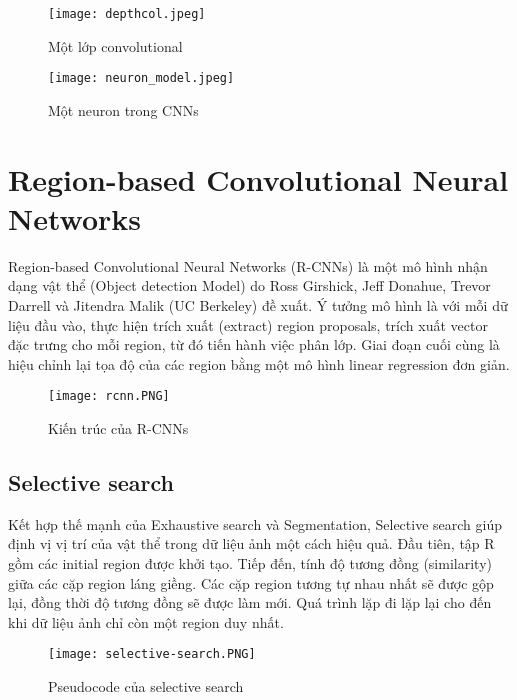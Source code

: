 \documentclass[../thesis.tex]{subfiles}
\begin{document}
\begin{figure}[!htb]
	\begin{minipage}{0.48\textwidth}
		\centering
		\texttt{[image: depthcol.jpeg]}
		\caption{Một lớp convolutional}\label{Fig:depthcol}
	\end{minipage}\hfill
	\begin {minipage}{0.48\textwidth}
		\centering
		\texttt{[image: neuron\_model.jpeg]}
		\caption{Một neuron trong CNNs}\label{Fig:neural_model}
	\end{minipage}
\end{figure}

\section{Region-based Convolutional Neural Networks}

Region-based Convolutional Neural Networks (R-CNNs) là một mô hình nhận dạng vật thể (Object detection Model) do Ross Girshick, Jeff Donahue, Trevor Darrell và Jitendra Malik (UC Berkeley) đề xuất. Ý tưởng mô hình là với mỗi dữ liệu đầu vào, thực hiện trích xuất (extract) region proposals, trích xuất vector đặc trưng cho mỗi region, từ đó tiến hành việc phân lớp. Giai đoạn cuối cùng là hiệu chỉnh lại tọa độ của các region bằng một mô hình linear regression đơn giản.

\begin{figure}[!htb]
	\centering
	\texttt{[image: rcnn.PNG]}
	\caption{Kiến trúc của R-CNNs}\label{Fig:rcnn}
\end{figure}

\subsection{Selective search}

Kết hợp thế mạnh của Exhaustive search và Segmentation, Selective search giúp định vị vị trí của vật thể trong dữ liệu ảnh một cách hiệu quả. Đầu tiên, tập R gồm các initial region được khởi tạo. Tiếp đến, tính độ tương đồng (similarity) giữa các cặp region láng giềng. Các cặp region tương tự nhau nhất sẽ được gộp lại, đồng thời độ tương đồng sẽ được làm mới. Quá trình lặp đi lặp lại cho đến khi dữ liệu ảnh chỉ còn một region duy nhất.

\begin{figure}[!htb]
	\centering
	\texttt{[image: selective-search.PNG]}
	\caption{Pseudocode của selective search}\label{Fig:selective_search}
\end{figure}
\end{document}
